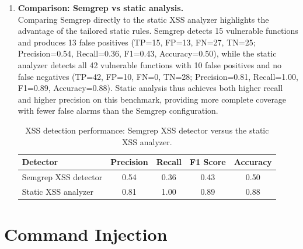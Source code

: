 \begin{enumerate}
  \item \textbf{Comparison: Semgrep vs static analysis.}\\
  Comparing Semgrep directly to the static XSS analyzer highlights the advantage of the
  tailored static rules. Semgrep detects 15 vulnerable functions and produces 13 false
  positives (TP=15, FP=13, FN=27, TN=25; Precision=0.54, Recall=0.36, F1=0.43,
  Accuracy=0.50), while the static analyzer detects all 42 vulnerable functions with
  10 false positives and no false negatives (TP=42, FP=10, FN=0, TN=28; Precision=0.81,
  Recall=1.00, F1=0.89, Accuracy=0.88). Static analysis thus achieves both higher recall
  and higher precision on this benchmark, providing more complete coverage with fewer
  false alarms than the Semgrep configuration.

  \begin{table}[htbp]
    \centering
    \small
    \begin{tabular}{lcccc}
      \textbf{Detector} & \textbf{Precision} & \textbf{Recall} & \textbf{F1 Score} & \textbf{Accuracy} \\
      \hline
      Semgrep XSS detector & 0.54 & 0.36 & 0.43 & 0.50 \\
      Static XSS analyzer & 0.81 & 1.00 & 0.89 & 0.88 \\
    \end{tabular}
    \caption{XSS detection performance: Semgrep XSS detector versus the static XSS analyzer.}
    \label{tab:xss_semgrep_vs_static}
  \end{table}
\end{enumerate}

\section{Command Injection}
\label{sec:results_cmd}

